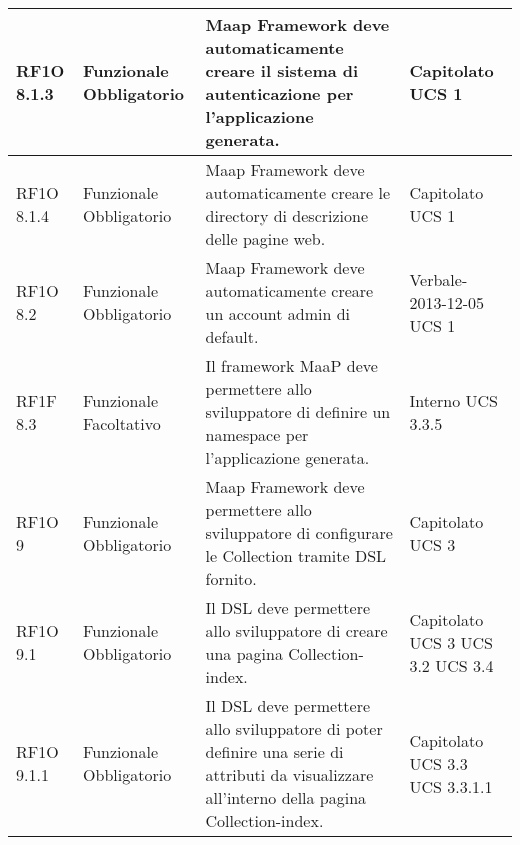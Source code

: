 \begin{center}
\begin{longtable}{ | l | p{2cm} | p{5cm} | p{1.7cm} |}
				RF1O 8.1.3 & Funzionale \newline  Obbligatorio  & Maap Framework deve automaticamente creare il sistema di autenticazione per l’applicazione generata. &  Capitolato \newline  UCS 1 \newline  \\ \hline      
				RF1O 8.1.4 & Funzionale \newline  Obbligatorio  & Maap Framework deve automaticamente creare le directory di descrizione delle pagine web. &  Capitolato \newline  UCS 1 \newline  \\ \hline      
				RF1O 8.2 & Funzionale \newline  Obbligatorio  & Maap Framework deve automaticamente creare un account admin di default. &  Verbale-2013-12-05 \newline  UCS 1 \newline  \\ \hline      
				RF1F 8.3 & Funzionale \newline  Facoltativo  & Il framework MaaP deve permettere allo sviluppatore di definire un namespace per l’applicazione generata. &  Interno \newline  UCS 3.3.5 \newline  \\ \hline      
				RF1O 9 & Funzionale \newline  Obbligatorio  & Maap Framework deve permettere allo sviluppatore di configurare le Collection tramite DSL fornito. &  Capitolato \newline  UCS 3 \newline  \\ \hline      
				RF1O 9.1 & Funzionale \newline  Obbligatorio  & Il DSL deve permettere allo sviluppatore di creare una pagina Collection-index. &  Capitolato \newline  UCS 3 \newline  UCS 3.2 \newline  UCS 3.4 \newline  \\ \hline      
				RF1O 9.1.1 & Funzionale \newline  Obbligatorio  & Il DSL deve permettere allo sviluppatore di poter definire una serie di attributi da visualizzare all’interno della pagina Collection-index. &  Capitolato \newline  UCS 3.3 \newline  UCS 3.3.1.1 \newline  \\ \hline      

\end{longtable}
\end{center}
